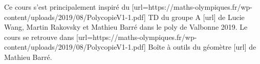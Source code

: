 Ce cours s'est principalement inspiré du [url=https://maths-olympiques.fr/wp-content/uploads/2019/08/PolycopieV1-1.pdf] TD du groupe A [url] de Lucie Wang, Martin Rakovsky et Mathieu Barré dans le poly de Valbonne 2019. Le cours se retrouve dans [url=https://maths-olympiques.fr/wp-content/uploads/2019/08/PolycopieV1-1.pdf] Boîte à outils du géomètre [url] de Mathieu Barré.